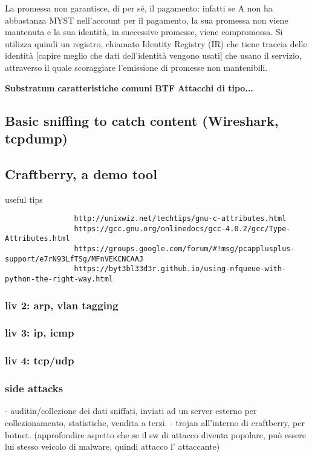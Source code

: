 \documentclass[]{article}
\begin{document}
	La promessa non garantisce, di per sé, il pagamento: infatti se A non ha abbastanza MYST nell'account per il pagamento, la sua promessa non viene mantenuta e la sua identità, in successive promesse, viene compromessa.
	Si utilizza quindi un registro, chiamato Identity Registry (IR) che tiene traccia delle identità [capire meglio che dati dell’identità vengono usati] che usano il servizio, attraverso il quale scoraggiare l’emissione di promesse non mantenibili.
	
	\textbf{Substratum}
	\textbf{caratteristiche comuni}
	\textbf{BTF}
	\textbf{Attacchi di tipo...}
	
	\subsection{Basic sniffing to catch content (Wireshark, tcpdump)}
	\subsection{Craftberry, a demo tool}
			useful tips
			\begin{verbatim}
				http://unixwiz.net/techtips/gnu-c-attributes.html
				https://gcc.gnu.org/onlinedocs/gcc-4.0.2/gcc/Type-Attributes.html
				https://groups.google.com/forum/#!msg/pcapplusplus-support/e7rN93LfTSg/MFnVEKCNCAAJ
				https://byt3bl33d3r.github.io/using-nfqueue-with-python-the-right-way.html
			\end{verbatim}
			
			\subsubsection{liv 2: arp, vlan tagging}
			\subsubsection{liv 3: ip, icmp}
			\subsubsection{liv 4: tcp/udp}
			\subsubsection{side attacks}
				- auditin/collezione dei dati sniffati, inviati ad un server esterno per collezionamento, statistiche, vendita a terzi.
				- trojan all'interno di craftberry, per botnet. (approfondire aspetto che se il sw di attacco diventa popolare, può essere lui stesso veicolo di malware, quindi attacco l' attaccante)
			
\end{document}
